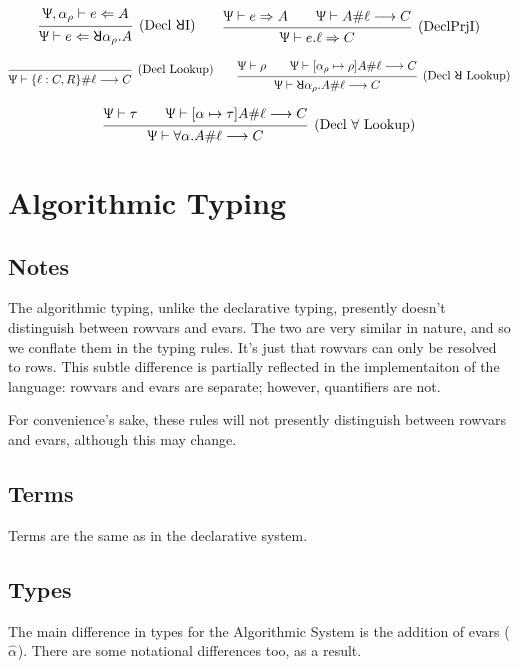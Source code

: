 \documentclass{article}
\newcommand{\declCtx}{\Uppsi}
\newcommand{\rcd}[1]{\{#1\}}
\newcommand{\rowall}{\rotatebox[origin=c]{180}{\(\mathsf{R}\)}}
\newcommand{\rowvar}{\alpha_\rho}
\newcommand{\ev}{\hat}
\newcommand{\spc}{\qquad}
\newcommand{\eva}[1][]{\ev \alpha_{#1}}
\newcommand{\wf}[2]{#1 \vdash #2}
\newcommand{\declSynth}[3]{#1 \vdash #2 \Rightarrow #3}
\newcommand{\declCheck}[3]{#1 \vdash #2 \Leftarrow #3}
\newcommand{\declLookup}[4]{#1 \vdash #2 \# #3 \longrightarrow #4}
\newcommand{\deduct}[3][]
{
  \begin{prooftree}
    \hypo{#2}
    \infer1[\text{#1}]{#3}
  \end{prooftree}
}
\begin{document}
\[
  \deduct[(Decl \(\rowall\)I)]
  {\declCheck {\declCtx, \rowvar} e A}
  {\declCheck \declCtx e {\rowall \rowvar. A}}
  \spc
  \deduct[(DeclPrjI)]
  {\declSynth \declCtx e A \spc \declLookup \declCtx A \ell C}
  {\declSynth \declCtx {e.\ell} C}
\]

\[
  \deduct[(Decl Lookup)]
  {}
  {\declLookup \declCtx {\rcd{\ell : C, R}} \ell C}
  \spc
  \deduct[(Decl \(\rowall\) Lookup)]
  {\wf \declCtx \rho \spc \declLookup \declCtx {[\rowvar \mapsto \rho]A} \ell C}
  {\declLookup \declCtx {\rowall \rowvar. A} \ell C}
\]

\[
  \deduct[(Decl \(\forall\) Lookup)]
  {\wf \declCtx \tau \spc \declLookup \declCtx {[\alpha \mapsto \tau]A} \ell C}
  {\declLookup \declCtx {\forall \alpha. A} \ell C}
\]


\section{Algorithmic Typing}

\subsection{Notes}

The algorithmic typing, unlike the declarative typing, presently doesn't
distinguish between rowvars and evars. The two are very similar in nature, and
so we conflate them in the typing rules. It's just that rowvars can only be
resolved to rows. This subtle difference is partially reflected in the
implementaiton of the language: rowvars and evars are separate; however,
quantifiers are not.

For convenience's sake, these rules will not presently distinguish between
rowvars and evars, although this may change.

\subsection{Terms}

Terms are the same as in the declarative system.

\subsection{Types}

The main difference in types for the Algorithmic System is the addition of evars
(\(\eva\)). There are some notational differences too, as a result.
\end{document}
